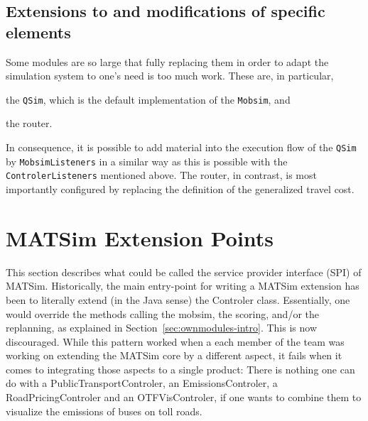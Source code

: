 \subsection{Extensions to and modifications of specific elements}

Some modules are so large that fully replacing them in order to adapt the simulation system to one's need is too much work.  These are, in particular,
\begin{compactitem}
\item the \verb$QSim$, which is the default implementation of the \verb$Mobsim$, and
\item the router.
\end{compactitem}
In consequence, it is possible to add material into the execution flow of the \verb$QSim$ by \verb$MobsimListeners$ in a similar way as this is possible with the \verb$ControlerListeners$ mentioned above.
%
The router, in contrast, is most importantly configured by replacing the definition of the generalized travel cost. 

\section{MATSim Extension Points}
This section describes what could be called the service provider interface (SPI) of MATSim.
Historically, the main entry-point for writing a MATSim extension has been to literally extend (in the Java sense)
the Controler class.  Essentially, one would override the methods calling the mobsim, the scoring, and/or the replanning, as explained in Section~\ref{sec:ownmodules-intro}. This is now discouraged. While this pattern worked when a each member of the team
was working on extending the MATSim core by a different aspect, it fails when it comes to
integrating those aspects to a single product: There is nothing one can do with a PublicTransportControler, an EmissionsControler, a RoadPricingControler and an OTFVisControler,
if one wants to combine them to visualize the emissions of buses on toll roads.

